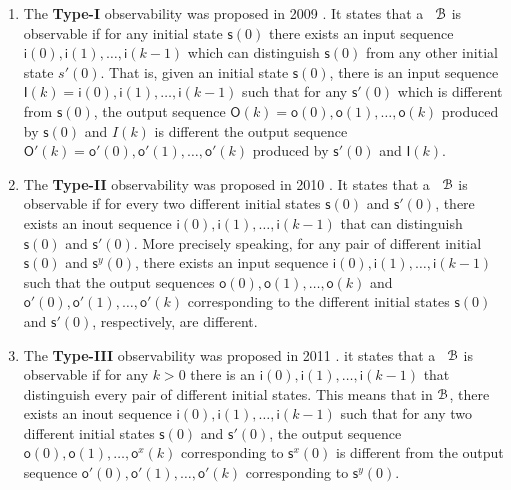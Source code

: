 \begin{enumerate}
	\item The  {\bf Type-I}  observability was proposed in 2009 \cite{cheng2009controllability}. It states that a \BCN\ ${\mathcal{B}}$ is observable if for any initial state   $\mathsf{s}(0)$ there exists an input sequence  $\mathsf{i}(0),\mathsf{i}(1),\ldots,\mathsf{i}(k-1)$ which can  distinguish $\mathsf{s}(0)$ from any other initial state $s'(0)$. That is,  given an initial state $\mathsf{s}(0)$, there is an input sequence $\mathsf{I}(k)=\mathsf{i}(0),\mathsf{i}(1),\ldots,\mathsf{i}(k-1)$ such that  for any  $\mathsf{s}'(0)$ which is different from $\mathsf{s}(0)$, the output sequence  $\mathsf{O}(k)=\mathsf{o}(0),\mathsf{o}(1),\ldots,\mathsf{o}(k)$ produced by  $\mathsf{s}(0)$ and $I(k)$ is different the output sequence  $\mathsf{O}'(k)=\mathsf{o}'(0),\mathsf{o}'(1),\ldots, \mathsf{o}'(k)$ produced by  $\mathsf{s}'(0)$ and $\mathsf{I}(k)$.
	\item 
	The  {\bf Type-II} observability was proposed in 2010 \cite{Zhao2010Input}. It states that a \BCN\ ${\mathcal{B}}$ is observable if for every two different initial states $\mathsf{s}(0)$ and $\mathsf{s}'(0)$, there exists an inout sequence $\mathsf{i}(0),\mathsf{i}(1),\ldots, \mathsf{i}(k-1)$ that can distinguish $\mathsf{s}(0)$ and $\mathsf{s}'(0)$. More precisely speaking,  for any pair of different initial  $\mathsf{s}(0)$ and $\mathsf{s}^{y}(0)$, there exists an input sequence  $\mathsf{i}(0),\mathsf{i}(1),\ldots,\mathsf{i}(k-1)$ such that the output sequences $\mathsf{o}(0),\mathsf{o}(1),\ldots,\mathsf{o}(k)$ and  $\mathsf{o}'(0),\mathsf{o}'(1),\ldots,\mathsf{o}'(k)$ corresponding to  the different initial states  $\mathsf{s}(0)$ and $\mathsf{s}'(0)$, respectively, are different.
	\item The  {\bf Type-III} observability was proposed in 2011 \cite{Cheng2011Identification}.  it states that a \BCN\ ${\mathcal{B}}$ is observable if for any $k>0$ there is an $\mathsf{i}(0),\mathsf{i}(1),\ldots, \mathsf{i}(k-1)$ that distinguish every pair of different initial states. This means that in ${\mathcal{B}}$, there exists an inout sequence  $\mathsf{i}(0),\mathsf{i}(1), \ldots,\mathsf{i}(k-1)$ such that for any two different initial states $\mathsf{s}(0)$ and $\mathsf{s}'(0)$, the output sequence $\mathsf{o}(0),\mathsf{o}(1), \ldots, \mathsf{o}^{x}(k)$  corresponding to  $\mathsf{s}^{x}(0)$  is different from the output sequence  $\mathsf{o}'(0),\mathsf{o}'(1),\ldots, \mathsf{o}'(k)$ corresponding to $\mathsf{s}^{y}(0)$.
	

\end{enumerate}
